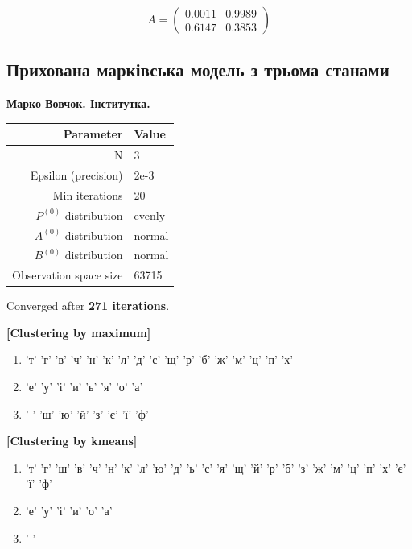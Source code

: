 \documentclass[12pt,a4paper]{article}
\begin{document}
  \[ A = \begin{pmatrix} 0.0011 & 0.9989 \\ 0.6147 & 0.3853 \end{pmatrix}  \] 




  \subsection{Прихована марківська модель з трьома станами}


  \textbf{Марко Вовчок. Інститутка.}

  \begin{center}
  \begin{tabular}{ | r | l | }
    \hline
    Parameter & Value \\
    \hline
    N & 3 \\
    \hline
    Epsilon (precision) & 2e-3 \\
    \hline
    Min iterations & 20 \\
    \hline
    $P^{(0)}$ distribution & evenly \\
    \hline
    $A^{(0)}$ distribution & normal \\
    \hline
    $B^{(0)}$ distribution & normal \\
    \hline
    Observation space size & 63715 \\
    \hline
  \end{tabular}
  \end{center}

  Converged after \textbf{271 iterations}.

  \textbf{[Clustering by maximum]}
  \begin{enumerate}
    \item 'т' 'г' 'в' 'ч' 'н' 'к' 'л' 'д' 'с' 'щ' 'р' 'б' 'ж' 'м' 'ц' 'п' 'х'
    \item 'е' 'у' 'і' 'и' 'ь' 'я' 'о' 'а'
    \item ' ' 'ш' 'ю' 'й' 'з' 'є' 'ї' 'ф'
  \end{enumerate}

  \textbf{[Clustering by kmeans]}
  \begin{enumerate}
    \item 'т' 'г' 'ш' 'в' 'ч' 'н' 'к' 'л' 'ю' 'д' 'ь' 'с' 'я' 'щ' 'й' 'р' 'б' 'з' 'ж' 'м' 'ц' 'п' 'х' 'є' 'ї' 'ф'
    \item 'е' 'у' 'і' 'и' 'о' 'а'
    \item ' '
  \end{enumerate}
\end{document}
